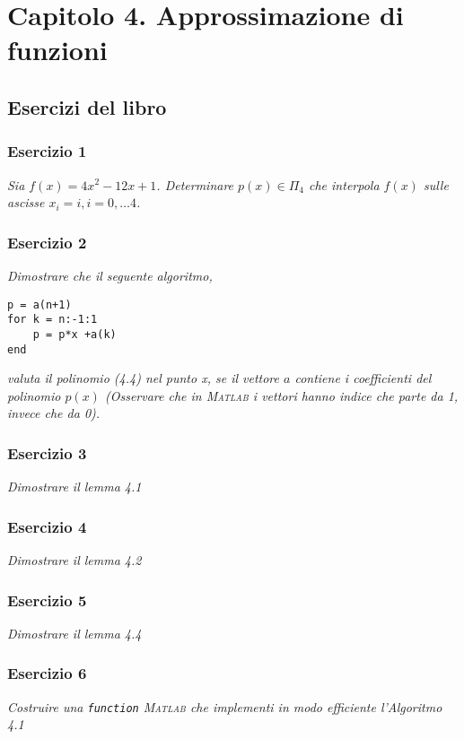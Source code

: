 \chapter{Capitolo 4. Approssimazione di funzioni}
\section{Esercizi del libro}

\subsection{Esercizio 1}
\label{sub:Esercizio 1}
\emph{Sia $f(x) = 4x^{2} - 12x +1$. Determinare $p(x) \in \Pi_{4} $ che interpola $f(x)$ sulle ascisse $x_{i} = i, i = 0, \ldots 4$.}

\subsection{Esercizio 2}
\label{sub:Esercizio 2}
\emph{Dimostrare che il seguente algoritmo, \\}
\lstset{language=Matlab}
\begin{lstlisting}
p = a(n+1)
for k = n:-1:1
	p = p*x +a(k)
end
\end{lstlisting}
\emph{valuta il polinomio (4.4) nel punto x, se il vettore $a$ contiene i coefficienti del polinomio $p(x)$ (Osservare che in \textsc{Matlab} i vettori hanno indice che parte da 1, invece che da 0).}

\subsection{Esercizio 3}
\label{sub:Esercizio 3}
\emph{Dimostrare il lemma 4.1}

\subsection{Esercizio 4}
\label{sub:Esercizio 4}
\emph{Dimostrare il lemma 4.2}

\subsection{Esercizio 5}
\label{sub:Esercizio 5}
\emph{Dimostrare il lemma 4.4}

\subsection{Esercizio 6}
\label{sub:Esercizio 6}
\emph{Costruire una \lstinline{function} \textsc{Matlab} che implementi in modo efficiente l'Algoritmo 4.1}

